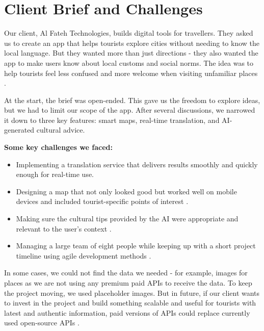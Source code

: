 \section{Client Brief and Challenges}

Our client, Al Fateh Technologies, builds digital tools for travellers. They asked us to create an app that helps tourists explore cities without needing to know the local language. But they wanted more than just directions - they also wanted the app to make users know about local customs and social norms. The idea was to help tourists feel less confused and more welcome when visiting unfamiliar places \cite{culturegap}.

At the start, the brief was open-ended. This gave us the freedom to explore ideas, but we had to limit our scope of the app. After several discussions, we narrowed it down to three key features: smart maps, real-time translation, and AI-generated cultural advice.

\textbf{Some key challenges we faced:}
\begin{itemize}
  \item Implementing a translation service that delivers results smoothly and quickly enough for real-time use.
  \item Designing a map that not only looked good but worked well on mobile devices and included tourist-specific points of interest \cite{uxTourism}.
  \item Making sure the cultural tips provided by the AI were appropriate and relevant to the user’s context \cite{aiBias}.
  \item Managing a large team of eight people while keeping up with a short project timeline using agile development methods \cite{agileTeams}.
\end{itemize}

In some cases, we could not find the data we needed - for example, images for places as we are not using any premium paid APIs to receive the data. To keep the project moving, we used placeholder images. But in future, if our client wants to invest in the project and build something scalable and useful for tourists with latest and authentic information, paid versions of APIs could replace currently used open-source APIs \cite{crowdsourcing}.

